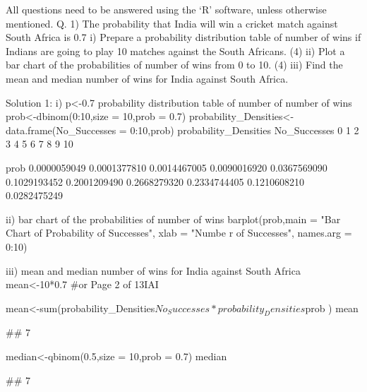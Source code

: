 \documentclass[a4paper,12pt]{article}
\begin{document}
All questions need to be answered using the ‘R’ software, unless otherwise mentioned.
Q. 1)
The probability that India will win a cricket match against South Africa is 0.7
i) Prepare a probability distribution table of number of wins if Indians are going to play 10
matches against the South Africans. (4)
ii) Plot a bar chart of the probabilities of number of wins from 0 to 10. (4)
iii) Find the mean and median number of wins for India against South Africa.


Solution 1:
i)
p<-0.7
probability distribution table of number of number of wins
prob<-dbinom(0:10,size = 10,prob = 0.7)
probability_Densities<-data.frame(No_Successes = 0:10,prob)
probability_Densities
No_Successes
0
1
2
3
4
5
6
7
8
9
10


prob
0.0000059049
0.0001377810
0.0014467005
0.0090016920
0.0367569090
0.1029193452
0.2001209490
0.2668279320
0.2334744405
0.1210608210
0.0282475249

ii)
bar chart of the probabilities of number of wins
barplot(prob,main = "Bar Chart of Probability of Successes", xlab = "Numbe
r of Successes", names.arg = 0:10)

iii)
mean and median number of wins for India against South Africa
mean<-10*0.7 #or
Page 2 of 13IAI

mean<-sum(probability_Densities$No_Successes*probability_Densities$prob
)
mean

##  7

median<-qbinom(0.5,size = 10,prob = 0.7)
median

##  7
\end{document}
